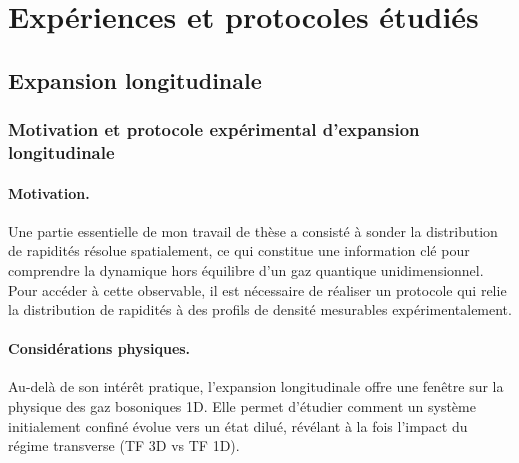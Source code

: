 \section{Expériences et protocoles étudiés}
\subsection{Expansion longitudinale}

\subsubsection{Motivation et protocole expérimental d’expansion longitudinale}

\paragraph{Motivation.}
Une partie essentielle de mon travail de thèse a consisté à sonder la distribution de rapidités résolue spatialement, ce qui constitue une information clé pour comprendre la dynamique hors équilibre d’un gaz quantique unidimensionnel. Pour accéder à cette observable, il est nécessaire de réaliser un protocole qui relie la distribution de rapidités à des profils de densité mesurables expérimentalement. %

\paragraph{Considérations physiques.}
Au-delà de son intérêt pratique, l’expansion longitudinale offre une fenêtre sur la physique des gaz bosoniques 1D. Elle permet d’étudier comment un système initialement confiné évolue vers un état dilué, révélant à la fois l’impact du régime transverse (\gls{TF} 3D vs \gls{TF} 1D).%

